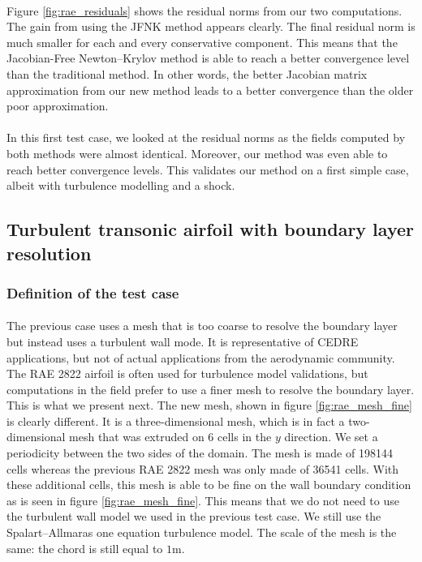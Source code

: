         \paragraph{}
        Figure \ref{fig:rae_residuals} shows the residual norms from our two computations.
        The gain from using the JFNK method appears clearly.
        The final residual norm is much smaller for each and every conservative component.
        This means that the Jacobian-Free Newton--Krylov method is able to reach a better convergence level than the traditional method.
        In other words, the better Jacobian matrix approximation from our new method leads to a better convergence than the older poor approximation.

        \paragraph{}
        In this first test case, we looked at the residual norms as the fields computed by both methods were almost identical.
        Moreover, our method was even able to reach better convergence levels.
        This validates our method on a first simple case, albeit with turbulence modelling and a shock.


    \subsection{Turbulent transonic airfoil with boundary layer resolution}

      \subsubsection{Definition of the test case}

        \paragraph{}
        The previous case uses a mesh that is too coarse to resolve the boundary layer but instead uses a turbulent wall mode.
        It is representative of CEDRE applications, but not of actual applications from the aerodynamic community.
        The RAE 2822 airfoil is often used for turbulence model validations, but computations in the field prefer to use a finer mesh to resolve the boundary layer.
        This is what we present next.
        The new mesh, shown in figure \ref{fig:rae_mesh_fine} is clearly different.
        It is a three-dimensional mesh, which is in fact a two-dimensional mesh that was extruded on 6 cells in the $y$ direction.
        We set a periodicity between the two sides of the domain.
        The mesh is made of \num{198144} cells whereas the previous RAE 2822 mesh was only made of \num{36541} cells.
        With these additional cells, this mesh is able to be fine on the wall boundary condition as is seen in figure \ref{fig:rae_mesh_fine}.
        This means that we do not need to use the turbulent wall model we used in the previous test case.
        We still use the Spalart--Allmaras one equation turbulence model.
        The scale of the mesh is the same: the chord is still equal to $1\si{\meter}$.

